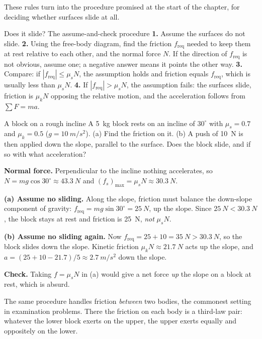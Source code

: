 These rules turn into the procedure promised at the start of the chapter, for deciding whether
surfaces slide at all.

\begin{methodbox}{Does it slide? The assume-and-check procedure}
\textbf{1.} Assume the surfaces do not slide. \textbf{2.} Using the free-body diagram, find the friction
$f_{\text{req}}$ needed to keep them at rest relative to each other, and the normal force $N$. If the
direction of $f_{\text{req}}$ is not obvious, assume one; a negative answer means it points the other way.
\textbf{3.} Compare: if $|f_{\text{req}}|\le\mu_s N$, the assumption holds and friction equals
$f_{\text{req}}$, which is usually less than $\mu_s N$. \textbf{4.} If $|f_{\text{req}}|>\mu_s N$, the
assumption fails: the surfaces slide, friction is $\mu_k N$ opposing the relative motion, and the
acceleration follows from $\sum F=ma$.
\end{methodbox}

\begin{exbox}{A block on a rough incline}\label{ex:roughincline}
A \SI{5}{kg} block rests on an incline of $30^\circ$ with $\mu_s=0.7$ and $\mu_k=0.5$ ($g=\SI{10}{m/s^2}$).
(a) Find the friction on it. (b) A push of \SI{10}{N} is then applied down the slope, parallel to the
surface. Does the block slide, and if so with what acceleration?

 \textbf{Normal force.} Perpendicular to the incline nothing accelerates, so
$N=mg\cos30^\circ\approx\SI{43.3}{N}$ and $(f_s)_{\max}=\mu_sN\approx\SI{30.3}{N}$.

 \textbf{(a) Assume no sliding.} Along the slope, friction must balance the down-slope component of
gravity: $f_{\text{req}}=mg\sin30^\circ=\SI{25}{N}$, up the slope. Since $\SI{25}{N}<\SI{30.3}{N}$, the
block stays at rest and friction is \SI{25}{N}, \emph{not} $\mu_sN$.

 \textbf{(b) Assume no sliding again.} Now $f_{\text{req}}=25+10=\SI{35}{N}>\SI{30.3}{N}$, so the
block slides down the slope. Kinetic friction $\mu_kN\approx\SI{21.7}{N}$ acts up the slope, and
$a=(25+10-21.7)/5\approx\SI{2.7}{m/s^2}$ down the slope.

 \textbf{Check.} Taking $f=\mu_sN$ in (a) would give a net force \emph{up} the slope on a
block at rest, which is absurd. 
\end{exbox}

The same procedure handles friction \emph{between} two bodies, the commonest setting in examination
problems. There the friction on each body is a third-law pair: whatever the lower block exerts on the
upper, the upper exerts equally and oppositely on the lower.

